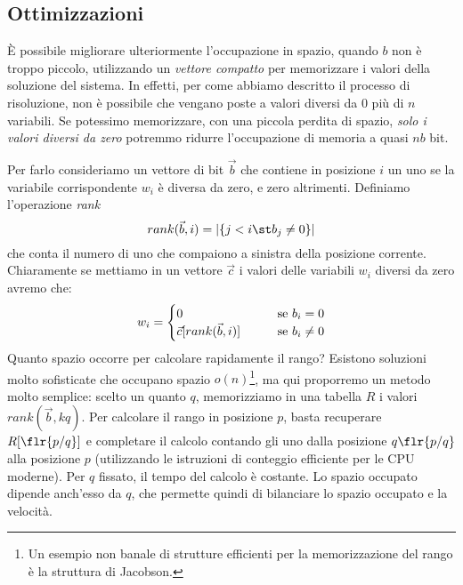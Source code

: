 \subsection{Ottimizzazioni}
È possibile migliorare ulteriormente l'occupazione in spazio, quando $b$ non è troppo piccolo, utilizzando un \textit{vettore compatto} per memorizzare i valori della soluzione del sistema. In effetti, per come abbiamo descritto il processo di risoluzione, non è possibile che vengano poste a valori diversi da 0 più di $n$ variabili. Se potessimo memorizzare, con una piccola perdita di spazio, \textit{solo i valori diversi da zero} potremmo ridurre l'occupazione di memoria a quasi $nb$ bit.

Per farlo consideriamo un vettore di bit $\vec{b}$ che contiene in posizione $i$ un uno se la variabile corrispondente $w_i$ è diversa da zero, e zero altrimenti. Definiamo l'operazione \textit{rank}
\begin{equation*}
    rank(\vec{b}, i) = |\{j < i \st b_j \neq 0\}|
\end{equation*}
che conta il numero di uno che compaiono a sinistra della posizione corrente. Chiaramente se mettiamo in un vettore $\vec{c}$ i valori delle variabili $w_i$ diversi da zero avremo che:
\begin{equation*}
    w_i =
    \begin{cases}
        0 \hspace{7mm} &\textnormal{se } b_i = 0\\
        \vec{c}[rank(\vec{b}, i)] \hspace{7mm} &\textnormal{se } b_i \neq 0\\
    \end{cases}
\end{equation*}
Quanto spazio occorre per calcolare rapidamente il rango? Esistono soluzioni molto sofisticate che occupano spazio $o(n)$\footnote{Un esempio non banale di strutture efficienti per la memorizzazione del rango è la struttura di Jacobson.}, ma qui proporremo un metodo molto semplice: scelto un quanto $q$, memorizziamo in una tabella $R$ i valori $rank(\vec{b}, kq)$. Per calcolare il rango in posizione $p$, basta recuperare $R[\flr{p / q}]$ e completare il calcolo contando gli uno dalla posizione $q\flr{p / q}$ alla posizione $p$ (utilizzando le istruzioni di conteggio efficiente per le CPU moderne). Per $q$ fissato, il tempo del calcolo è costante. Lo spazio occupato dipende anch'esso da $q$, che permette quindi di bilanciare lo spazio occupato e la velocità.

